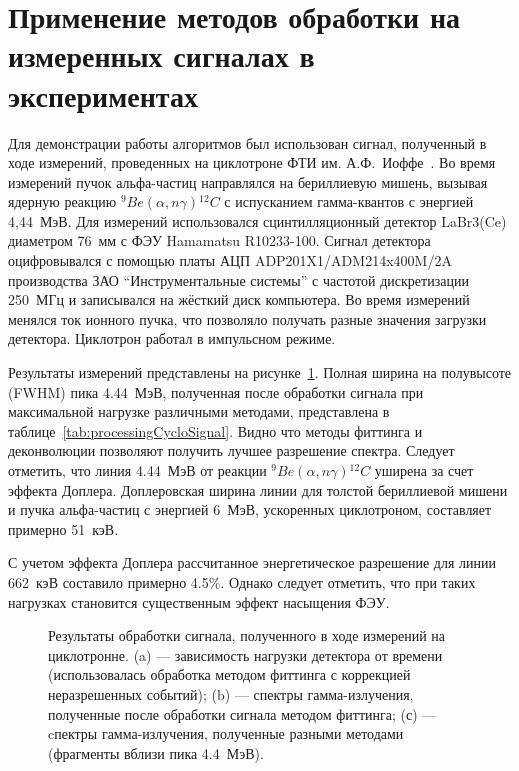 
\section{Применение методов обработки на измеренных сигналах в экспериментах}

Для демонстрации работы алгоритмов был использован сигнал, полученный в ходе измерений, проведенных на циклотроне ФТИ им. А.Ф.~Иоффе~\cite{Lemberg1987}. Во время измерений пучок альфа-частиц направлялся на бериллиевую мишень, вызывая ядерную реакцию ${}^9Be(\alpha,n\gamma){}^{12}C$ с испусканием гамма-квантов с энергией 4,44~МэВ. Для измерений использовался сцинтилляционный детектор LaBr3(Ce) диаметром 76~мм с ФЭУ Hamamatsu R10233-100. Сигнал детектора оцифровывался с помощью платы АЦП ADP201X1/ADM214x400M/2A производства ЗАО ``Инструментальные системы'' с частотой дискретизации 250~МГц и записывался на жёсткий диск компьютера. Во время измерений менялся ток ионного пучка, что позволяло получать разные значения загрузки детектора. Циклотрон работал в импульсном режиме.

Результаты измерений представлены на рисунке~\ref{fig:processingCycloSignal}. Полная ширина на полувысоте (FWHM) пика 4.44~МэВ, полученная после обработки сигнала при максимальной нагрузке различными методами, представлена в таблице~\ref{tab:processingCycloSignal}. Видно что методы фиттинга и деконволюции позволяют получить лучшее разрешение спектра. Следует отметить, что линия 4.44~МэВ от реакции ${}^9Be(\alpha,n\gamma){}^{12}C$ уширена за счет эффекта Доплера. Доплеровская ширина линии для толстой бериллиевой мишени и пучка альфа-частиц с энергией 6~МэВ, ускоренных циклотроном, составляет примерно 51~кэВ.~\cite{Khilkevitch2020}

С учетом эффекта Доплера рассчитанное энергетическое разрешение для линии 662~кэВ составило примерно 4.5\%. Однако следует отметить, что при таких нагрузках становится существенным эффект насыщения ФЭУ.

\begin{figure}[ht!]
  \caption{ Результаты обработки сигнала, полученного в ходе измерений на циклотронне. (a) --- зависимость нагрузки детектора от времени (использовалась обработка методом фиттинга с коррекцией неразрешенных событий); (b) --- спектры гамма-излучения, полученные после обработки сигнала методом фиттинга; (с) --- cпектры гамма-излучения, полученные разными методами (фрагменты вблизи пика 4.4~МэВ).~\cite{Khilkevitch2020} }
  \label{fig:processingCycloSignal}
\end{figure}


